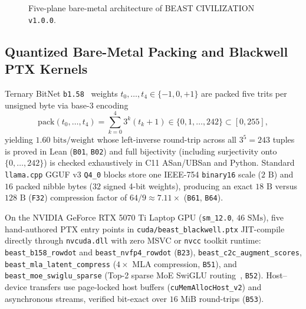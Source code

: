 \documentclass[11pt,letterpaper]{amsart}
\newcommand{\code}[1]{{\small\texttt{#1}}}
\begin{document}
\begin{figure}[t]
\caption{Five-plane bare-metal architecture of \textsc{BEAST CIVILIZATION} \code{v1.0.0}.}
\label{fig:arch}
\end{figure}

\subsection{Quantized Bare-Metal Packing and Blackwell PTX Kernels}
Ternary BitNet \code{b1.58}~\cite{ma2024era} weights $t_0,\dots,t_4 \in \{-1,0,+1\}$
are packed five trits per unsigned byte via base-$3$ encoding
\begin{equation}
\label{eq:b158}
  \mathrm{pack}(t_0,\dots,t_4) = \sum_{k=0}^{4} 3^k (t_k + 1) \in \{0,1,\dots,242\} \subset [0,255],
\end{equation}
yielding $1.60\text{ bits/weight}$ whose left-inverse round-trip across all
$3^5 = 243$ tuples is proved in Lean (\code{B01}, \code{B02}) and full
bijectivity (including surjectivity onto $\{0,\dots,242\}$) is checked
exhaustively in C11 ASan/UBSan and Python. Standard \code{llama.cpp} GGUF v3 \code{Q4\_0} blocks store one IEEE-754
\code{binary16} scale ($2\text{ B}$) and $16$ packed nibble bytes ($32$ signed
4-bit weights), producing an exact $18\text{ B}$ versus $128\text{ B}$ (\code{F32})
compression factor of $64/9 \approx 7.11\times$ (\code{B61}, \code{B64}).

On the NVIDIA GeForce RTX 5070 Ti Laptop GPU (\code{sm\_12.0}, $46\text{ SMs}$),
five hand-authored PTX entry points in \code{cuda/beast\_blackwell.ptx} JIT-compile
directly through \code{nvcuda.dll} with zero MSVC or \code{nvcc} toolkit runtime:
\code{beast\_b158\_rowdot} and \code{beast\_nvfp4\_rowdot} (\code{B23}),
\code{beast\_c2c\_augment\_scores}, \code{beast\_mla\_latent\_compress} ($4\times$
MLA compression, \code{B51}), and \code{beast\_moe\_swiglu\_sparse} (Top-2 sparse
MoE SwiGLU routing~\cite{shazeer2017outrageously,fedus2022switch}, \code{B52}).
Host--device transfers use page-locked host buffers (\code{cuMemAllocHost\_v2}) and
asynchronous streams, verified bit-exact over $16\text{ MiB}$ round-trips (\code{B53}).
\end{document}
